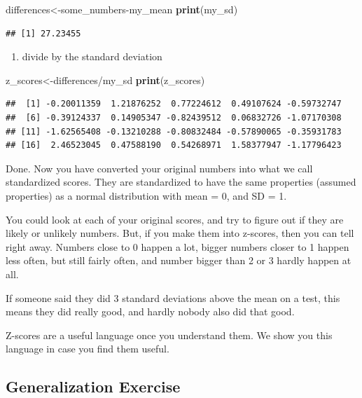 \documentclass[]{book}
\newenvironment{Shaded}{\begin{snugshade}}{\end{snugshade}}
\newcommand{\KeywordTok}[1]{\textcolor[rgb]{0.13,0.29,0.53}{\textbf{{#1}}}}
\newcommand{\NormalTok}[1]{{#1}}
\providecommand{\tightlist}{%
  \setlength{\itemsep}{0pt}\setlength{\parskip}{0pt}}
\theoremstyle{definition}
\theoremstyle{definition}
\theoremstyle{definition}
\theoremstyle{remark}
\begin{document}
\begin{Shaded}
\begin{Highlighting}[]
\NormalTok{differences<-some_numbers-my_mean}
\KeywordTok{print}\NormalTok{(my_sd)}
\end{Highlighting}
\end{Shaded}

\begin{verbatim}
## [1] 27.23455
\end{verbatim}

\begin{enumerate}
\def\labelenumi{\arabic{enumi}.}
\setcounter{enumi}{3}
\tightlist
\item
  divide by the standard deviation
\end{enumerate}

\begin{Shaded}
\begin{Highlighting}[]
\NormalTok{z_scores<-differences/my_sd}
\KeywordTok{print}\NormalTok{(z_scores)}
\end{Highlighting}
\end{Shaded}

\begin{verbatim}
##  [1] -0.20011359  1.21876252  0.77224612  0.49107624 -0.59732747
##  [6] -0.39124337  0.14905347 -0.82439512  0.06832726 -1.07170308
## [11] -1.62565408 -0.13210288 -0.80832484 -0.57890065 -0.35931783
## [16]  2.46523045  0.47588190  0.54268971  1.58377947 -1.17796423
\end{verbatim}

Done. Now you have converted your original numbers into what we call
standardized scores. They are standardized to have the same properties
(assumed properties) as a normal distribution with mean = 0, and SD = 1.

You could look at each of your original scores, and try to figure out if
they are likely or unlikely numbers. But, if you make them into
z-scores, then you can tell right away. Numbers close to 0 happen a lot,
bigger numbers closer to 1 happen less often, but still fairly often,
and number bigger than 2 or 3 hardly happen at all.

If someone said they did 3 standard deviations above the mean on a test,
this means they did really good, and hardly nobody also did that good.

Z-scores are a useful language once you understand them. We show you
this language in case you find them useful.

\subsection{Generalization Exercise}\label{generalization-exercise-2}
\end{document}

